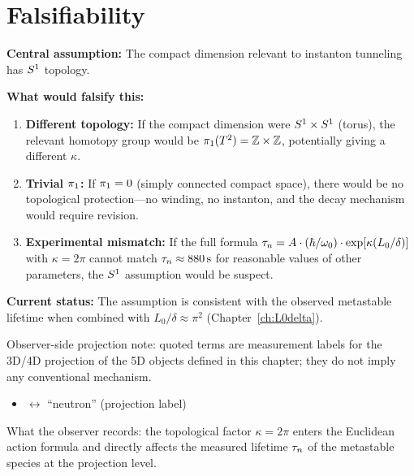 \section{Falsifiability}
\label{sec:kappa:falsify}

\begin{edcopenbox}[title=Assumption Check and Falsifiability]
    \textbf{Central assumption:} The compact dimension relevant to instanton
    tunneling has $S^1$ topology. \tagP

    \textbf{What would falsify this:}
    \begin{enumerate}
        \item \textbf{Different topology:} If the compact dimension were
              $S^1 \times S^1$ (torus), the relevant homotopy group would
              be $\pi_1(T^2) = \mathbb{Z} \times \mathbb{Z}$, potentially
              giving a different $\kappa$.

        \item \textbf{Trivial $\pi_1$:} If $\pi_1 = 0$ (simply connected
              compact space), there would be no topological protection---no
              winding, no instanton, and the decay mechanism would require
              revision.

        \item \textbf{Experimental mismatch:} If the full formula
              $\tau_n = A \cdot (\hbar/\omega_0) \cdot \exp[\kappa(L_0/\delta)]$
              with $\kappa = 2\pi$ cannot match $\tau_n \approx 880\,\mathrm{s}$
              for reasonable values of other parameters, the $S^1$ assumption
              would be suspect.
    \end{enumerate}

    \textbf{Current status:} The assumption is consistent with the observed
    metastable lifetime when combined with $L_0/\delta \approx \pi^2$
    (Chapter~\ref{ch:L0delta}).
\end{edcopenbox}


\begin{observerbox}
Observer-side projection note: quoted terms are measurement labels for the
3D/4D projection of the 5D objects defined in this chapter; they do not
imply any conventional mechanism.

\begin{itemize}
    \item \MetastableJunction{} $\leftrightarrow$ ``neutron'' (projection label)
\end{itemize}

What the observer records: the topological factor $\kappa = 2\pi$ enters
the Euclidean action formula and directly affects the measured lifetime
$\tau_n$ of the metastable species at the projection level.
\end{observerbox}

